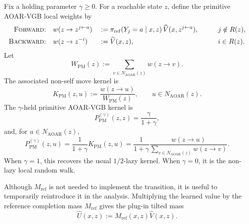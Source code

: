 \documentclass{article}
\numberwithin{theorem}{section}
\numberwithin{proposition}{section}
\numberwithin{corollary}{section}
\numberwithin{lemma}{section}
\numberwithin{conjecture}{section}
\numberwithin{remark}{section}
\numberwithin{definition}{section}
\numberwithin{assumption}{section}
\numberwithin{example}{section}
\providecommand{\base}{\pi_{\mathrm{ref}}}
\begin{document}
\begin{definition}
\label{def:primitive_aoar_weights}
Fix a holding parameter $\gamma\ge 0$. For a reachable state $z$, define the primitive AOAR-VGB local weights by
\begin{alignat*}{3}
    \textsc{Forward:}\quad
    & w(z\to z^{j\leftarrow a}) &&:= \base(Y_j=a\mid x,z)\, \widehat V(x,z^{j\leftarrow a}), \qquad && j\notin R(z),\\
    \textsc{Backward:}\quad
    & w(z\to z^{-i}) &&:= \widehat V(x,z), \qquad && i\in R(z).
\end{alignat*}
Let
\begin{equation*}
    W_{\mathrm{PM}}(z) := \sum_{v\in N_{\mathrm{AOAR}}(z)} w(z\to v).
\end{equation*}
The associated non-self move kernel is
\begin{equation*}
    K_{\mathrm{PM}}(z,u) := \frac{w(z\to u)}{W_{\mathrm{PM}}(z)}, \qquad u\in N_{\mathrm{AOAR}}(z).
\end{equation*}
The $\gamma$-held primitive AOAR-VGB kernel is
\begin{equation*}
    P_{\mathrm{PM}}^{(\gamma)}(z,z)=\frac{\gamma}{1+\gamma},
\end{equation*}
and, for $u\in N_{\mathrm{AOAR}}(z)$,
\begin{equation*}
    P_{\mathrm{PM}}^{(\gamma)}(z,u) = \frac{1}{1+\gamma}K_{\mathrm{PM}}(z,u) = \frac{1}{1+\gamma}\frac{w(z\to u)}{\sum_{v\in N_{\mathrm{AOAR}}(z)}w(z\to v)}.
\end{equation*}
When $\gamma=1$, this recovers the usual $1/2$-lazy kernel. When $\gamma=0$, it is the non-lazy local random walk.
\end{definition}


Although $M_{\text{ref}}$ is not needed to implement the transition, it is useful to temporarily reintroduce it in the analysis. Multiplying the learned value by the reference completion mass $M_{\text{ref}}$  gives the plug-in tilted mass
\begin{equation*}
    \widehat U(x,z) := M_{\text{ref}}(x,z)\widehat V(x,z).
\end{equation*}
\end{document}
